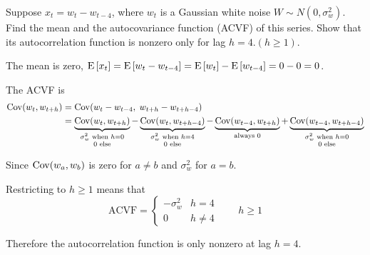 Suppose $x_t = w_t - w_{t-4}$, where $w_t$ is a Gaussian white noise $W \sim N (0, \sigma^2_w)$. Find the
mean and the autocovariance function (ACVF) of this series. Show that its autocorrelation
function is nonzero only for lag $h = 4. (h \geq 1)$.

\soln

\nl The mean is zero, $\Eb{x_t} = \Eb{w_t - w_{t-4}} = \Eb{w_t} - \Eb{w_{t-4}} = 0 - 0 = 0$.

\nl The ACVF is 
\begin{align*}
    \operatorname{Cov}(w_t, w_{t+h}) &= \operatorname{Cov}(w_t - w_{t-4},\; w_{t+h} - w_{t+h-4})\\
    &= \underbrace{\operatorname{Cov}(w_t, w_{t+h})}_{\substack{\sigma^2_w \text{ when } h=0\\0 \text{ else}}}
     - \underbrace{\operatorname{Cov}(w_t, w_{t+h-4})}_{\substack{\sigma^2_w \text{ when } h=4\\0 \text{ else}}}
     - \underbrace{\operatorname{Cov}(w_{t-4}, w_{t+h})}_{\text{always 0}}
    + \underbrace{\operatorname{Cov}(w_{t-4}, w_{t+h-4})}_{\substack{\sigma^2_w \text{ when } h=0\\0 \text{ else}}}
\end{align*}

\noindent Since $\operatorname{Cov}(w_a, w_b)$ is zero for $a \neq b$ and $\sigma^2_w$ for $a = b$.

\nl Restricting to $h \geq 1$ means that 
$$\text{ACVF} = \begin{cases}
    - \sigma^2_w & h = 4\\
    0 & h \neq 4
\end{cases} \qquad h \geq 1$$

\nl Therefore the autocorrelation function is only nonzero at lag $h=4$.